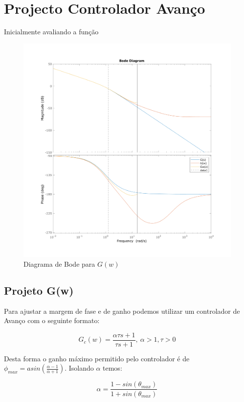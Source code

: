 \documentclass[a4paper,11pt]{article}
\begin{document}
\section{Projecto Controlador Avanço}

Inicialmente avaliando a função 

\begin{figure}[H]
    \centering
    \includegraphics[width=0.8\linewidth]{img/exsim4-bodeplot-compare.png}
    \caption{Diagrama de Bode para $G(w)$}
\end{figure}

\subsection{Projeto G(w)}

Para ajustar a margem de fase e de ganho podemos utilizar um controlador de Avanço com o seguinte formato:

\begin{equation}
    G_c(w) = \frac{\alpha \tau s + 1}{\tau s + 1},\ \alpha > 1, \tau > 0
\end{equation}

Desta forma o ganho máximo permitido pelo controlador é de $\phi_{max} = asin\left( \frac{\alpha - 1}{\alpha + 1} \right)$. Isolando $\alpha$ temos:

\begin{equation}
    \alpha = \frac{1-sin(\theta_{max})}{1+sin(\theta_{max})}
\end{equation} 
\end{document}
